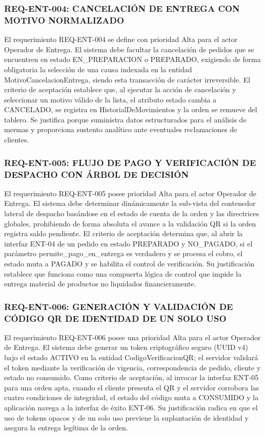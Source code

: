 \subsubsection{REQ-ENT-004: CANCELACIÓN DE ENTREGA CON MOTIVO NORMALIZADO}
El requerimiento REQ-ENT-004 se define con prioridad Alta para el actor Operador de Entrega. El sistema debe facultar la cancelación de pedidos que se encuentren en estado EN\_PREPARACION o PREPARADO, exigiendo de forma obligatoria la selección de una causa indexada en la entidad MotivoCancelacionEntrega, siendo esta transacción de carácter irreversible. El criterio de aceptación establece que, al ejecutar la acción de cancelación y seleccionar un motivo válido de la lista, el atributo estado cambia a CANCELADO, se registra en HistorialDeMovimientos y la orden se remueve del tablero. Se justifica porque suministra datos estructurados para el análisis de mermas y proporciona sustento analítico ante eventuales reclamaciones de clientes.

\subsubsection{REQ-ENT-005: FLUJO DE PAGO Y VERIFICACIÓN DE DESPACHO CON ÁRBOL DE DECISIÓN}
El requerimiento REQ-ENT-005 posee prioridad Alta para el actor Operador de Entrega. El sistema debe determinar dinámicamente la sub-vista del contenedor lateral de despacho basándose en el estado de cuenta de la orden y las directrices globales, prohibiendo de forma absoluta el avance a la validación QR si la orden registra saldo pendiente. El criterio de aceptación determina que, al abrir la interfaz ENT-04 de un pedido en estado PREPARADO y NO\_PAGADO, si el parámetro permite\_pago\_en\_entrega es verdadero y se procesa el cobro, el estado muta a PAGADO y se habilita el control de verificación. Su justificación establece que funciona como una compuerta lógica de control que impide la entrega material de productos no liquidados financieramente.

\subsubsection{REQ-ENT-006: GENERACIÓN Y VALIDACIÓN DE CÓDIGO QR DE IDENTIDAD DE UN SOLO USO}
El requerimiento REQ-ENT-006 posee una prioridad Alta para el actor Operador de Entrega. El sistema debe generar un token criptográfico seguro (UUID v4) bajo el estado ACTIVO en la entidad CodigoVerificacionQR; el servidor validará el token mediante la verificación de vigencia, correspondencia de pedido, cliente y estado no consumido. Como criterio de aceptación, al invocar la interfaz ENT-05 para una orden apta, cuando el cliente presenta el QR y el servidor corrobora las cuatro condiciones de integridad, el estado del código muta a CONSUMIDO y la aplicación navega a la interfaz de éxito ENT-06. Su justificación radica en que el uso de tokens opacos y de un solo uso previene la suplantación de identidad y asegura la entrega legítima de la orden.

